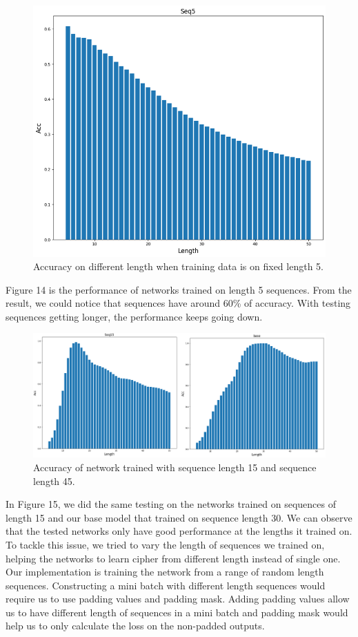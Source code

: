 \begin{figure}
    \centering
    \includegraphics[width=0.7\linewidth]{myReport//figures/seq5_multi_length.png}
    \caption{Accuracy on different length when training data is on fixed length 5.}
    \label{fig:enter-label}
\end{figure}

Figure 14 is the performance of networks trained on length 5 sequences. From the result, we could notice that sequences have around 60\% of accuracy. With testing sequences getting longer, the performance keeps going down.

\begin{figure}[hbt!]
    \centering
    \includegraphics[width=0.75\linewidth]{myReport//figures/seq15_seq45_multi_length.png}
    \caption{Accuracy of network trained with sequence length 15 and sequence length 45.}
    \label{fig:enter-label}
\end{figure}



In Figure 15, we did the same testing on the networks trained on sequences of length 15 and our base model that trained on sequence length 30. We can observe that the tested networks only have good performance at the lengths it trained on. To tackle this issue, we tried to vary the length of sequences we trained on, helping the networks to learn cipher from different length instead of single one. Our implementation is training the network from a range of random length sequences. Constructing a mini batch with different length sequences would require us to use padding values and padding mask. Adding padding values allow us to have different length of sequences in a mini batch and padding mask would help us to only calculate the loss on the non-padded outputs.


